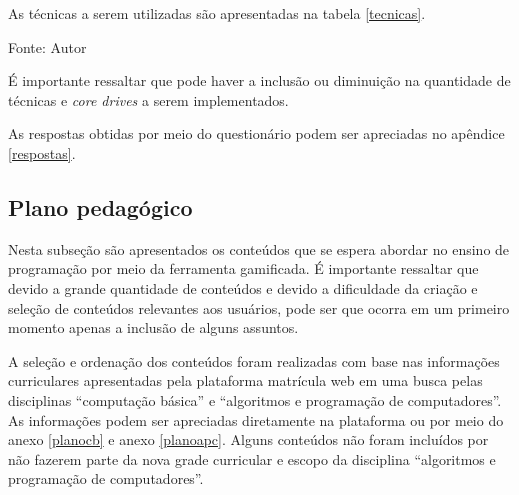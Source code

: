 As técnicas a serem utilizadas são apresentadas na tabela \ref{tecnicas}.


\begin{table}[h]
	\centering
	\caption{Técnicas a serem utilizadas.}
	\label{tecnicas}
	Fonte: Autor
\end{table}

É importante ressaltar que pode haver a inclusão ou diminuição na quantidade de técnicas e \textit{core drives} a serem implementados.

As respostas obtidas por meio do questionário podem ser apreciadas no apêndice \ref{respostas}.


\subsection{Plano pedagógico}

Nesta subseção são apresentados os conteúdos que se espera abordar no ensino de programação por meio da ferramenta gamificada. É importante  
ressaltar que devido a grande quantidade de conteúdos e devido a dificuldade da criação e seleção de conteúdos relevantes aos usuários, pode 
ser que ocorra em um primeiro momento apenas a inclusão de alguns assuntos. 

A seleção e ordenação dos conteúdos foram realizadas com base nas informações curriculares apresentadas pela plataforma matrícula web em uma 
busca pelas disciplinas “computação básica” e “algoritmos e programação de computadores”. As informações podem ser apreciadas diretamente na 
plataforma ou por meio do anexo \ref{planocb} e anexo \ref{planoapc}. Alguns conteúdos não foram incluídos por não fazerem parte da nova grade curricular e escopo da 
disciplina “algoritmos e programação de computadores”.

